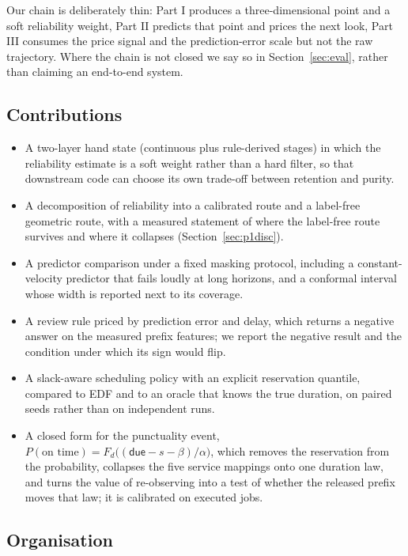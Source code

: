 \documentclass{swmcmthesis}
\begin{document}
Our chain is deliberately thin: Part I produces a three-dimensional point and a soft reliability
weight, Part II predicts that point and prices the next look, Part III consumes
the price signal and the prediction-error scale but not the raw trajectory. Where
the chain is not closed we say so in Section~\ref{sec:eval}, rather than claiming
an end-to-end system.

\subsection{Contributions}

\begin{itemize}
  \item A two-layer hand state (continuous plus \slotNStages{} rule-derived
        stages) in which the reliability estimate is a soft weight rather than a
        hard filter, so that downstream code can choose its own trade-off between
        retention and purity.
  \item A decomposition of reliability into a calibrated route and a label-free
        geometric route, with a measured statement of where the label-free route
        survives and where it collapses (Section~\ref{sec:p1disc}).
  \item A predictor comparison under a fixed masking protocol, including a
        constant-velocity predictor that fails loudly at long horizons, and a
        conformal interval whose width is reported next to its coverage.
  \item A review rule priced by prediction error and delay, which returns a
        negative answer on the measured prefix features; we report the negative
        result and the condition under which its sign would flip.
  \item A slack-aware scheduling policy with an explicit reservation quantile,
        compared to EDF and to an oracle that knows the true duration, on paired
        seeds rather than on independent runs.
  \item A closed form for the punctuality event, $P(\text{on time})=
        F_d\big((\textsf{due}-s-\beta)/\alpha\big)$, which removes the reservation
        from the probability, collapses the five service mappings onto one duration
        law, and turns the value of re-observing into a test of whether the released
        prefix moves that law; it is calibrated on \slotPCFJobs{} executed jobs.
\end{itemize}

\subsection{Organisation}
\end{document}
